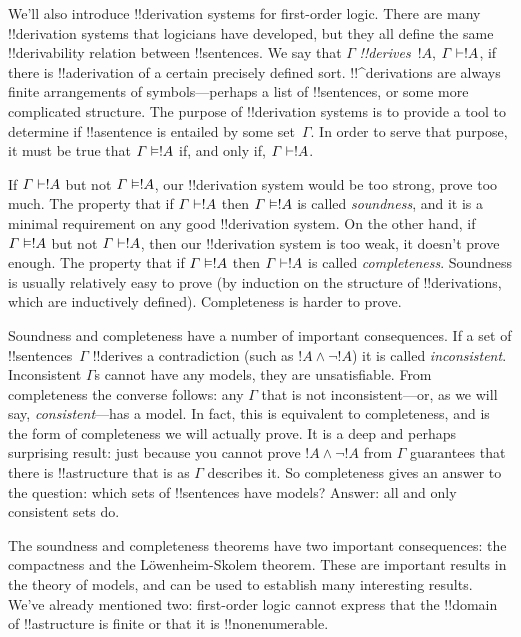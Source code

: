 \documentclass[../../../include/open-logic-section]{subfiles}
\begin{document}


We'll also introduce !!{derivation} systems for first-order logic.  There are
many !!{derivation} systems that logicians have developed, but they all define
the same !!{derivability} relation between !!{sentence}s. We say that
$\Gamma$ \emph{!!{derive}s}~$!A$, $\Gamma \Proves !A$, if there is
!!a{derivation} of a certain precisely defined sort. !!^{derivation}s
are always finite arrangements of symbols---perhaps a list of
!!{sentence}s, or some more complicated structure.  The purpose of
!!{derivation} systems is to provide a tool to determine if !!a{sentence} is
entailed by some set~$\Gamma$.  In order to serve that purpose, it
must be true that $\Gamma \Entails !A$ if, and only if, $\Gamma
\Proves !A$.

If $\Gamma \Proves !A$ but not $\Gamma \Entails !A$, our !!{derivation} system
would be too strong, prove too much.  The property that if $\Gamma
\Proves !A$ then $\Gamma \Entails !A$ is called \emph{soundness}, and
it is a minimal requirement on any good !!{derivation} system. On the other
hand, if $\Gamma \Entails !A$ but not $\Gamma \Proves !A$, then our
!!{derivation} system is too weak, it doesn't prove enough.  The property that
if $\Gamma \Entails !A$ then $\Gamma \Proves !A$ is called
\emph{completeness}. Soundness is usually relatively easy to prove (by
induction on the structure of !!{derivation}s, which are inductively
defined). Completeness is harder to prove.

Soundness and completeness have a number of important consequences. If
a set of !!{sentence}s~$\Gamma$ !!{derive}s a contradiction (such as
$!A \land \lnot !A$) it is called \emph{inconsistent}. Inconsistent
$\Gamma$s cannot have any models, they are unsatisfiable. From
completeness the converse follows: any $\Gamma$ that is not
inconsistent---or, as we will say, \emph{consistent}---has a model. In
fact, this is equivalent to completeness, and is the form of
completeness we will actually prove.  It is a deep and perhaps
surprising result: just because you cannot prove $!A \land \lnot !A$
from $\Gamma$ guarantees that there is !!a{structure} that is as
$\Gamma$ describes it.  So completeness gives an answer to the
question: which sets of !!{sentence}s have models? Answer: all and only
consistent sets do.

The soundness and completeness theorems have two important
consequences: the compactness and the L\"owenheim-Skolem theorem.
These are important results in the theory of models, and can be used
to establish many interesting results. We've already mentioned two:
first-order logic cannot express that the !!{domain} of !!a{structure}
is finite or that it is !!{nonenumerable}.
\end{document}
